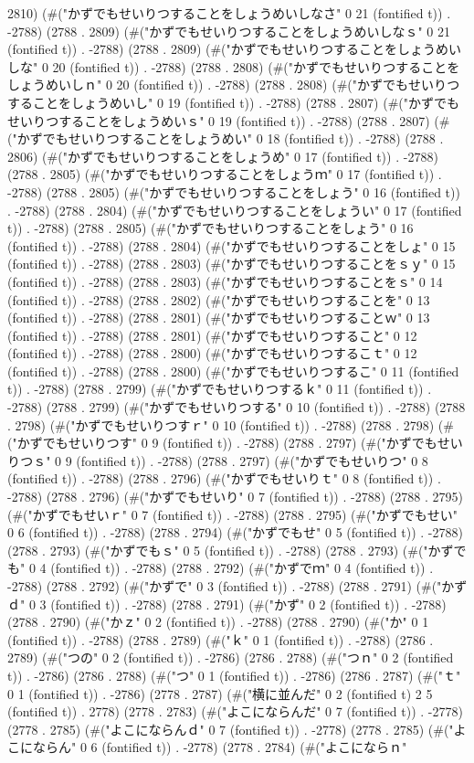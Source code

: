2810) (#("かずでもせいりつすることをしょうめいしなさ" 0 21 (fontified t)) . -2788) (2788 . 2809) (#("かずでもせいりつすることをしょうめいしなｓ" 0 21 (fontified t)) . -2788) (2788 . 2809) (#("かずでもせいりつすることをしょうめいしな" 0 20 (fontified t)) . -2788) (2788 . 2808) (#("かずでもせいりつすることをしょうめいしｎ" 0 20 (fontified t)) . -2788) (2788 . 2808) (#("かずでもせいりつすることをしょうめいし" 0 19 (fontified t)) . -2788) (2788 . 2807) (#("かずでもせいりつすることをしょうめいｓ" 0 19 (fontified t)) . -2788) (2788 . 2807) (#("かずでもせいりつすることをしょうめい" 0 18 (fontified t)) . -2788) (2788 . 2806) (#("かずでもせいりつすることをしょうめ" 0 17 (fontified t)) . -2788) (2788 . 2805) (#("かずでもせいりつすることをしょうｍ" 0 17 (fontified t)) . -2788) (2788 . 2805) (#("かずでもせいりつすることをしょう" 0 16 (fontified t)) . -2788) (2788 . 2804) (#("かずでもせいりつすることをしょうい" 0 17 (fontified t)) . -2788) (2788 . 2805) (#("かずでもせいりつすることをしょう" 0 16 (fontified t)) . -2788) (2788 . 2804) (#("かずでもせいりつすることをしょ" 0 15 (fontified t)) . -2788) (2788 . 2803) (#("かずでもせいりつすることをｓｙ" 0 15 (fontified t)) . -2788) (2788 . 2803) (#("かずでもせいりつすることをｓ" 0 14 (fontified t)) . -2788) (2788 . 2802) (#("かずでもせいりつすることを" 0 13 (fontified t)) . -2788) (2788 . 2801) (#("かずでもせいりつすることｗ" 0 13 (fontified t)) . -2788) (2788 . 2801) (#("かずでもせいりつすること" 0 12 (fontified t)) . -2788) (2788 . 2800) (#("かずでもせいりつするこｔ" 0 12 (fontified t)) . -2788) (2788 . 2800) (#("かずでもせいりつするこ" 0 11 (fontified t)) . -2788) (2788 . 2799) (#("かずでもせいりつするｋ" 0 11 (fontified t)) . -2788) (2788 . 2799) (#("かずでもせいりつする" 0 10 (fontified t)) . -2788) (2788 . 2798) (#("かずでもせいりつすｒ" 0 10 (fontified t)) . -2788) (2788 . 2798) (#("かずでもせいりつす" 0 9 (fontified t)) . -2788) (2788 . 2797) (#("かずでもせいりつｓ" 0 9 (fontified t)) . -2788) (2788 . 2797) (#("かずでもせいりつ" 0 8 (fontified t)) . -2788) (2788 . 2796) (#("かずでもせいりｔ" 0 8 (fontified t)) . -2788) (2788 . 2796) (#("かずでもせいり" 0 7 (fontified t)) . -2788) (2788 . 2795) (#("かずでもせいｒ" 0 7 (fontified t)) . -2788) (2788 . 2795) (#("かずでもせい" 0 6 (fontified t)) . -2788) (2788 . 2794) (#("かずでもせ" 0 5 (fontified t)) . -2788) (2788 . 2793) (#("かずでもｓ" 0 5 (fontified t)) . -2788) (2788 . 2793) (#("かずでも" 0 4 (fontified t)) . -2788) (2788 . 2792) (#("かずでｍ" 0 4 (fontified t)) . -2788) (2788 . 2792) (#("かずで" 0 3 (fontified t)) . -2788) (2788 . 2791) (#("かずｄ" 0 3 (fontified t)) . -2788) (2788 . 2791) (#("かず" 0 2 (fontified t)) . -2788) (2788 . 2790) (#("かｚ" 0 2 (fontified t)) . -2788) (2788 . 2790) (#("か" 0 1 (fontified t)) . -2788) (2788 . 2789) (#("ｋ" 0 1 (fontified t)) . -2788) (2786 . 2789) (#("つの" 0 2 (fontified t)) . -2786) (2786 . 2788) (#("つｎ" 0 2 (fontified t)) . -2786) (2786 . 2788) (#("つ" 0 1 (fontified t)) . -2786) (2786 . 2787) (#("ｔ" 0 1 (fontified t)) . -2786) (2778 . 2787) (#("横に並んだ" 0 2 (fontified t) 2 5 (fontified t)) . 2778) (2778 . 2783) (#("よこにならんだ" 0 7 (fontified t)) . -2778) (2778 . 2785) (#("よこにならんｄ" 0 7 (fontified t)) . -2778) (2778 . 2785) (#("よこにならん" 0 6 (fontified t)) . -2778) (2778 . 2784) (#("よこにならｎ" 